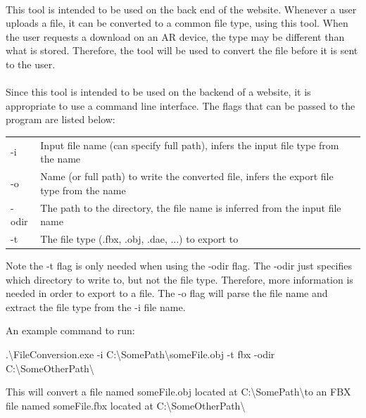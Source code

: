     \paragraph{}
    This tool is intended to be used on the back end of the website.  Whenever a user uploads a file, it can be converted to a common file type, using this tool.
    When the user requests a download on an AR device, the type may be different than what is stored.  Therefore, the tool will be used to convert the file before
    it is sent to the user.
    
    \paragraph{}
    Since this tool is intended to be used on the backend of a website, it is appropriate to use a command line interface.  
    The flags that can be passed to the program are listed below:
    
    \begin{table}[h]
        \centering
        \begin{tabular}{l  l}
            -i & Input file name (can specify full path), infers the input file type from the name \\
            -o & Name (or full path) to write the converted file, infers the export file type from the name \\
            -odir & The path to the directory, the file name is inferred from the input file name \\
            -t & The file type (.fbx, .obj, .dae, ...) to export to
        \end{tabular}
    \end{table}
    
    Note the -t flag is only needed when using the -odir flag.  The -odir just specifies which directory to write to, but not the file type.
    Therefore, more information is needed in order to export to a file.  The -o flag will parse the file name and extract the file type from the -i file name.
    
    An example command to run:
    
    \begin{center}
        .\textbackslash FileConversion.exe -i C:\textbackslash SomePath\textbackslash someFile.obj -t fbx -odir C:\textbackslash SomeOtherPath\textbackslash
    \end{center}
    
    This will convert a file named someFile.obj located at C:\textbackslash SomePath\textbackslash  to an FBX file named someFile.fbx located at 
    C:\textbackslash SomeOtherPath\textbackslash
    

